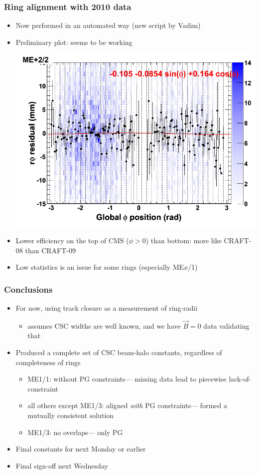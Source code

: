 \documentclass[compress]{beamer}
\begin{document}
\begin{frame}
\frametitle{Ring alignment with 2010 data}

\begin{itemize}
\item Now performed in an automated way (new script by Vadim)
\item Preliminary plot: seems to be working

\includegraphics[width=0.7\linewidth]{map_CSCvsphi_x.png}

\item Lower efficiency on the top of CMS ($\phi > 0$) than bottom:
  more like CRAFT-08 than CRAFT-09
\item Low statistics is an issue for some rings (especially ME$x$/1)
\end{itemize}
\end{frame}

\begin{frame}
\frametitle{Conclusions}

\begin{itemize}
\item For now, using track closure as a measurement of ring-radii
\begin{itemize}
\item assumes CSC widths are well known, and we have $\vec{B}=0$ data validating that
\end{itemize}
\item Produced a complete set of CSC beam-halo constants, regardless
  of completeness of rings
\begin{itemize}
\item ME1/1: without PG constraints--- missing data lead to piecewise lack-of-constraint
\item all others except ME1/3: aligned {\it with} PG constraints--- formed a mutually consistent solution
\item ME1/3: no overlaps--- only PG
\end{itemize}

\item Final constants for next Monday or earlier

\item Final sign-off next Wednesday
\end{itemize}

\label{numpages}
\end{frame}
\end{document}
